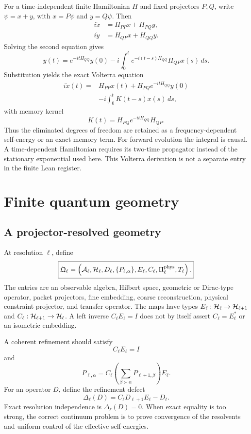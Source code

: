 For a time-independent finite Hamiltonian $H$ and fixed projectors $P,Q$, write $\psi=x+y$, with $x=P\psi$ and $y=Q\psi$. Then
\[
\begin{aligned}
i\dot x&=H_{PP}x+H_{PQ}y,\\
i\dot y&=H_{QP}x+H_{QQ}y.
\end{aligned}
\]
Solving the second equation gives
\[
y(t)
=e^{-itH_{QQ}}y(0)
-i\int_0^t e^{-i(t-s)H_{QQ}}H_{QP}x(s)\,ds.
\]
Substitution yields the exact Volterra equation
\[
\boxed{
\begin{aligned}
i\dot x(t)
={}&H_{PP}x(t)
+H_{PQ}e^{-itH_{QQ}}y(0)\\
&-i\int_0^t
K(t-s)x(s)\,ds,
\end{aligned}
}
\]
with memory kernel
\[
\boxed{
K(t)=H_{PQ}e^{-itH_{QQ}}H_{QP}.
}
\]
Thus the eliminated degrees of freedom are retained as a frequency-dependent self-energy or an exact memory term. For forward evolution the integral is causal. A time-dependent Hamiltonian requires its two-time propagator instead of the stationary exponential used here. This Volterra derivation is not a separate entry in the finite Lean register.

\section{Finite quantum geometry}\label{core:section:010}

\subsection{A projector-resolved geometry}

At resolution $\ell$, define
\[
\boxed{
\mathfrak Q_\ell
=
\left(
\cA_\ell,
\cH_\ell,
D_\ell,
\{P_{\ell,\alpha}\},
E_\ell,
C_\ell,
\Pi_\ell^{\mathrm{phys}},
T_\ell
\right).
}
\]
The entries are an observable algebra, Hilbert space, geometric or Dirac-type operator, packet projectors, fine embedding, coarse reconstruction, physical constraint projector, and transfer operator. The maps have types $E_\ell:\cH_\ell\to\cH_{\ell+1}$ and $C_\ell:\cH_{\ell+1}\to\cH_\ell$. A left inverse $C_\ell E_\ell=I$ does not by itself assert $C_\ell=E_\ell^*$ or an isometric embedding.

A coherent refinement should satisfy
\[
C_\ell E_\ell=I
\]
and
\[
\boxed{
P_{\ell,\alpha}
=
C_\ell
\left(
\sum_{\beta\succ\alpha}P_{\ell+1,\beta}
\right)
E_\ell.
}
\]
For an operator $D$, define the refinement defect
\[
\Delta_\ell(D)
=C_\ell D_{\ell+1}E_\ell-D_\ell.
\]
Exact resolution independence is $\Delta_\ell(D)=0$. When exact equality is too strong, the correct continuum problem is to prove convergence of the resolvents and uniform control of the effective self-energies.

